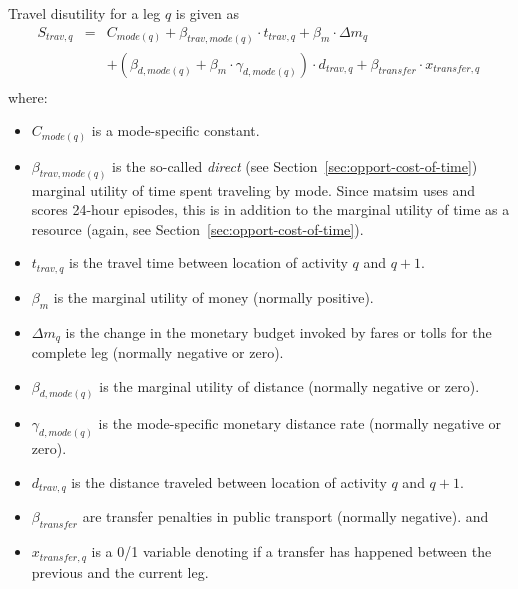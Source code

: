 
Travel disutility for a leg $q$ is given as 
\begin{equation}
\label{eq:tdisutility}
\begin{matrix}
S_{trav, q} & = & C_{mode(q)} + \beta_{trav, mode(q)} \cdot t_{trav, q} + \beta_{m} \cdot \Delta m_q \\
& & + (\beta_{d, mode(q)} + \beta_{m} \cdot \gamma_{d, mode(q)}) \cdot d_{trav,q} 
%
+ \beta_{transfer} \cdot x_{transfer,q} \, \\
\end{matrix}
\end{equation} 
where:
%
\begin{itemize}\styleItemize

\item $C_{mode(q)}$ is a mode-specific constant.

\item $\beta_{trav, mode(q)}$ is the so-called \emph{direct} (see Section~\ref{sec:opport-cost-of-time}) marginal utility of time spent traveling by mode.  Since \gls{matsim} uses and scores 24-hour episodes, this is in addition to the marginal utility of time as a resource (again, see Section~\ref{sec:opport-cost-of-time}).


\item $t_{trav, q}$ is the travel time between location of activity $q$ and $q+1$.

\item $\beta_{m}$ is the marginal utility of money (normally positive).

\item $\Delta m_q$ is the change in the monetary budget invoked by fares or tolls for the complete leg (normally negative or zero).
\item $\beta_{d, mode(q)}$ is the  marginal utility of distance (normally negative or zero).
\item $\gamma_{d, mode(q)}$ is the mode-specific monetary distance rate (normally negative or zero).
\item $d_{trav, q}$ is the distance traveled between location of activity $q$ and $q+1$.
\item $\beta_{transfer}$ are transfer penalties in public transport (normally negative).
and
\item $x_{transfer,q}$ is a 0/1 variable denoting if a transfer has happened between the previous and the current leg.
\end{itemize}
